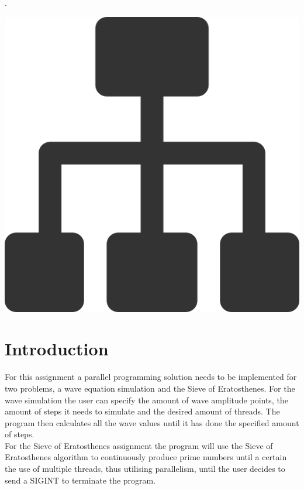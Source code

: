 \documentclass[a4paper,12px]{article}
\begin{document}
\tableofcontents
.\\
\begin{center}
    \includegraphics[width=(\textwidth/5*3)]{parallel_tasks}
\end{center}
\clearpage



\section{Introduction}

For this assignment a parallel programming solution needs to be implemented for
two problems, a wave equation simulation and the Sieve of Eratosthenes. For the
wave simulation the user can specify the amount of wave amplitude points, the
amount of steps it needs to simulate and the desired amount of threads. The
program then calculates all the wave values until it has done the specified
amount of steps.\\
For the Sieve of Eratosthenes assignment the program will use the Sieve of Eratosthenes
algorithm to continuously produce prime numbers until a certain
the use of multiple threads, thus utilising parallelism, until the user decides
to send a SIGINT to terminate the program.
\end{document}
